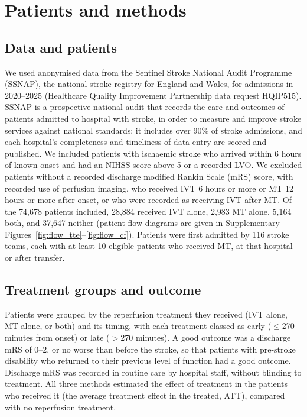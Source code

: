 \section{Patients and methods}

\subsection{Data and patients}

We used anonymised data from the Sentinel Stroke National Audit Programme (SSNAP), the national stroke registry for England and Wales, for admissions in 2020--2025 (Healthcare Quality Improvement Partnership data request HQIP515). SSNAP is a prospective national audit that records the care and outcomes of patients admitted to hospital with stroke, in order to measure and improve stroke services against national standards; it includes over 90\% of stroke admissions, and each hospital's completeness and timeliness of data entry are scored and published. We included patients with ischaemic stroke who arrived within 6 hours of known onset and had an NIHSS score above 5 or a recorded LVO. We excluded patients without a recorded discharge modified Rankin Scale (mRS) score, with recorded use of perfusion imaging, who received IVT 6 hours or more or MT 12 hours or more after onset, or who were recorded as receiving IVT after MT. Of the 74,678 patients included, 28,884 received IVT alone, 2,983 MT alone, 5,164 both, and 37,647 neither (patient flow diagrams are given in Supplementary Figures~\ref{fig:flow_tte}--\ref{fig:flow_cf}). Patients were first admitted by 116 stroke teams, each with at least 10 eligible patients who received MT, at that hospital or after transfer.

\subsection{Treatment groups and outcome}

Patients were grouped by the reperfusion treatment they received (IVT alone, MT alone, or both) and its timing, with each treatment classed as early ($\leq$270 minutes from onset) or late ($>$270 minutes). A good outcome was a discharge mRS of 0--2, or no worse than before the stroke, so that patients with pre-stroke disability who returned to their previous level of function had a good outcome.  Discharge mRS was recorded in routine care by hospital staff, without blinding to treatment. All three methods estimated the effect of treatment in the patients who received it (the average treatment effect in the treated, ATT), compared with no reperfusion treatment.

